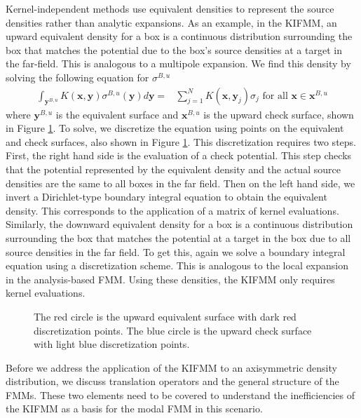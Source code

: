 \documentclass[11pt, oneside]{article}   	%
\begin{document}
Kernel-independent methods use equivalent densities to represent the source densities rather than analytic expansions. As an example, in the KIFMM, an upward equivalent density for a box is a continuous distribution surrounding the box that matches the potential due to the box's source densities at a target in the far-field. This is analogous to a multipole expansion. We find this density by solving the following equation for $\sigma^{B,u}$
\begin{align}
\int_{\mathbf{y}^{B,u}}{K(\mathbf{x},\mathbf{y})}\sigma^{B,u}{(\mathbf{y})}d\mathbf{y}=&\sum\limits_{j=1}^N K(\mathbf{x},\mathbf{y}_j)\sigma_j\mbox{ for all }\mathbf{x}\in\mathbf{x}^{B,u}
\end{align}
where $\mathbf{y}^{B,u}$ is the equivalent surface and $\mathbf{x}^{B,u}$ is the upward check surface, shown in Figure \ref{fig:6}. To solve, we discretize the equation using points on the equivalent and check surfaces, also shown in Figure \ref{fig:6}. This discretization requires two steps. First, the right hand side is the evaluation of a check potential. This step checks that the potential represented by the equivalent density and the actual source densities are the same to all boxes in the far field. Then on the left hand side, we invert a Dirichlet-type boundary integral equation to obtain the equivalent density. This corresponds to the application of a matrix of kernel evaluations. Similarly, the downward equivalent density for a box is a continuous distribution surrounding the box that matches the potential at a target in the box due to all source densities in the far field. To get this, again we solve a boundary integral equation using a discretization scheme. This is analogous to the local expansion in the analysis-based FMM. Using these densities, the KIFMM only requires kernel evaluations.

\begin{figure}[h]
\caption{The red circle is the upward equivalent surface with dark red discretization points. The blue circle is the upward check surface with light blue discretization points.}
\label{fig:6}
\centering
\end{figure}

Before we address the application of the KIFMM to an axisymmetric density distribution, we discuss translation operators and the general structure of the FMMs. These two elements need to be covered to understand the inefficiencies of the KIFMM as a basis for the modal FMM in this scenario.
\end{document}
